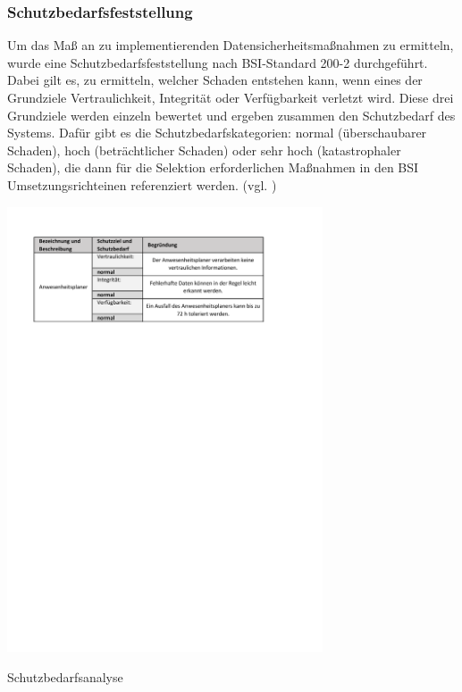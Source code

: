 \subsubsection{Schutzbedarfsfeststellung}
\label{sec:Schutzbedarfsfeststellung}
Um das Maß an zu implementierenden Datensicherheitsmaßnahmen zu ermitteln, wurde eine Schutzbedarfsfeststellung nach BSI-Standard 200-2 durchgeführt. Dabei gilt es, zu ermitteln, welcher Schaden entstehen kann, wenn eines der Grundziele Vertraulichkeit, Integrität oder Verfügbarkeit verletzt wird. Diese drei Grundziele werden einzeln bewertet und ergeben zusammen den Schutzbedarf des Systems. Dafür gibt es die Schutzbedarfskategorien: normal (überschaubarer Schaden), hoch (beträchtlicher Schaden) oder sehr hoch (katastrophaler Schaden), die dann für die Selektion erforderlichen Maßnahmen in den BSI Umsetzungsrichteinen referenziert werden. (vgl. \cite[S.104 - 109]{BSI200-2})

\begin{table}[htbp]
    \centering
    \includegraphics[width=0.7\textwidth,angle=0]{abb/Schutzbedarfsanalyse.pdf}
    \caption[Beschreibung]{Schutzbedarfsanalyse}
    \label{abb:Schutzbedarfsanalyse}
\end{table}


